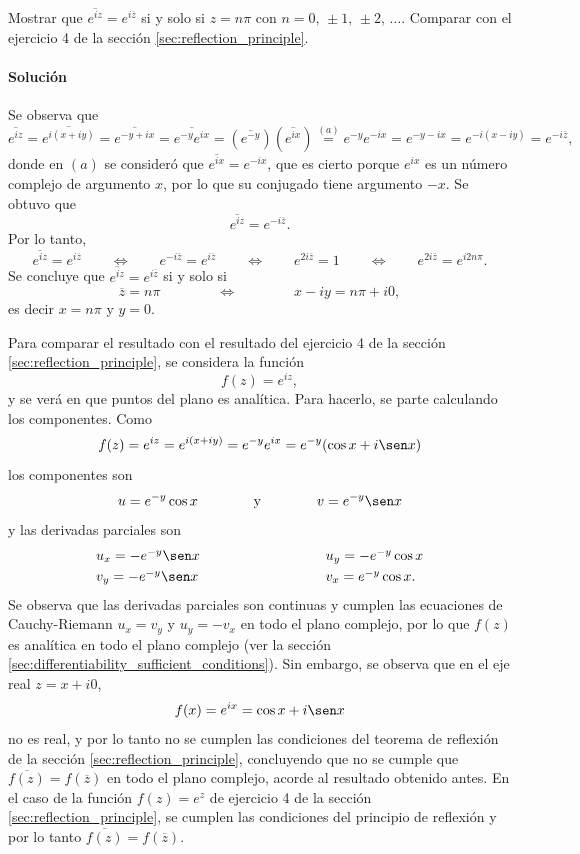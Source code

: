 \documentclass[a4paper]{report}
\begin{document}
Mostrar que \(\overline{e^{iz}}=e^{i\overline{z}}\) si y solo si \(z=n\pi\) con \(n=0,\,\pm1,\,\pm2,\,\dots\). Comparar con el ejercicio 4 de la sección \ref{sec:reflection_principle}.

\paragraph{Solución} Se observa que 
\[
 \overline{e^{iz}}=\overline{e^{i(x+iy)}}=\overline{e^{-y+ix}}=\overline{e^{-y}e^{ix}}=
 (\overline{e^{-y}})(\overline{e^{ix}})\overset{(a)}{=}e^{-y}e^{-ix}=e^{-y-ix}=e^{-i(x-iy)}=e^{-i\overline{z}}, 
\]
donde en \((a)\) se consideró que \(\overline{e^{ix}}=e^{-ix}\), que es cierto porque \(e^{ix}\) es un número complejo de argumento \(x\), por lo que su conjugado tiene argumento \(-x\). Se obtuvo que 
\[
 \overline{e^{iz}}=e^{-i\overline{z}}.
\]
Por lo tanto,
\[
 \overline{e^{iz}}=e^{i\overline{z}}
 \qquad\Leftrightarrow\qquad
 e^{-i\overline{z}}=e^{i\overline{z}}
 \qquad\Leftrightarrow\qquad
 e^{2i\overline{z}}=1
 \qquad\Leftrightarrow\qquad
 e^{2i\overline{z}}=e^{i2n\pi}.
\]
Se concluye que \(\overline{e^{iz}}=e^{i\overline{z}}\) si y solo si
\[
 \overline{z}=n\pi
 \qquad\qquad\Leftrightarrow\qquad\qquad
 x-iy=n\pi+i0,
\]
es decir \(x=n\pi\) y \(y=0\).

Para comparar el resultado con el resultado del ejercicio 4 de la sección \ref{sec:reflection_principle}, se considera la función
\[
 f(z)=e^{iz},
\]
y se verá en que puntos del plano es analítica. Para hacerlo, se parte calculando los componentes. Como
 \[
  f(z)=e^{iz}=e^{i(x+iy)}=e^{-y}e^{ix}=e^{-y}(\cos x+i\sen x)
 \]
 los componentes son 
 \[
  u=e^{-y}\cos x
  \qquad\qquad\textrm{y}\qquad\qquad
  v=e^{-y}\sen x
 \]
 y las derivadas parciales son
 \[
 \begin{array}{ll}
  u_x=-e^{-y}\sen x\qquad\qquad\qquad\qquad&u_y=-e^{-y}\cos x\\[\smallskipamount]
  v_y=-e^{-y}\sen x\qquad\qquad\qquad\qquad&v_x=e^{-y}\cos x.
 \end{array}
 \]
 Se observa que las derivadas parciales son continuas y cumplen las ecuaciones de Cauchy-Riemann \(u_x=v_y\) y \(u_y=-v_x\) en todo el plano complejo, por lo que \(f(z)\) es analítica en todo el plano complejo (ver la sección \ref{sec:differentiability_sufficient_conditions}). Sin embargo, se observa que en el eje real \(z=x+i0\),
 \[
  f(x)=e^{ix}=\cos x+i\sen x
 \]
 no es real, y por lo tanto no se cumplen las condiciones del teorema de reflexión de la sección \ref{sec:reflection_principle}, concluyendo que no se cumple que \(\overline{f(z)}=f(\overline{z})\) en todo el plano complejo, acorde al resultado obtenido antes. En el caso de la función \(f(z)=e^z\) de ejercicio 4 de la sección \ref{sec:reflection_principle}, se cumplen las condiciones del principio de reflexión y por lo tanto \(\overline{f(z)}=f(\overline{z})\).
\end{document}
